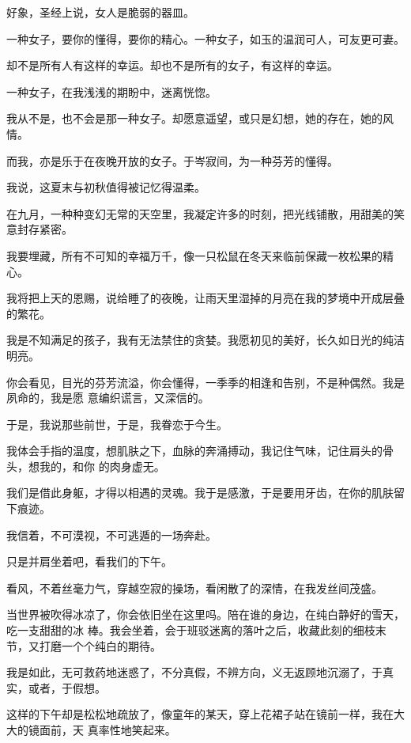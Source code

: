 		好象，圣经上说，女人是脆弱的器皿。

		一种女子，要你的懂得，要你的精心。一种女子，如玉的温润可人，可友更可妻。

		却不是所有人有这样的幸运。却也不是所有的女子，有这样的幸运。

		一种女子，在我浅浅的期盼中，迷离恍惚。

		我从不是，也不会是那一种女子。却愿意遥望，或只是幻想，她的存在，她的风情。

		而我，亦是乐于在夜晚开放的女子。于岑寂间，为一种芬芳的懂得。

	\endwriting



		我说，这夏末与初秋值得被记忆得温柔。


		\vspace{1em}
		在九月，一种种变幻无常的天空里，我凝定许多的时刻，把光线铺散，用甜美的笑意封存紧密。

		我要埋藏，所有不可知的幸福万千，像一只松鼠在冬天来临前保藏一枚松果的精心。

		我将把上天的恩赐，说给睡了的夜晚，让雨天里湿掉的月亮在我的梦境中开成层叠的繁花。

		我是不知满足的孩子，我有无法禁住的贪婪。我愿初见的美好，长久如日光的纯洁明亮。


		你会看见，目光的芬芳流溢，你会懂得，一季季的相逢和告别，不是种偶然。我是夙命的，我是愿
	意编织谎言，又深信的。

		于是，我说那些前世，于是，我眷恋于今生。

		我体会手指的温度，想肌肤之下，血脉的奔涌搏动，我记住气味，记住肩头的骨头，想我的，和你
	的肉身虚无。

		我们是借此身躯，才得以相遇的灵魂。我于是感激，于是要用牙齿，在你的肌肤留下痕迹。

		我信着，不可漠视，不可逃遁的一场奔赴。


		\vspace{1em}
		只是并肩坐着吧，看我们的下午。

		看风，不着丝毫力气，穿越空寂的操场，看闲散了的深情，在我发丝间茂盛。

		当世界被吹得冰凉了，你会依旧坐在这里吗。陪在谁的身边，在纯白静好的雪天，吃一支甜甜的冰
	棒。我会坐着，会于班驳迷离的落叶之后，收藏此刻的细枝末节，又打磨一个个纯白的期待。

		我是如此，无可救药地迷惑了，不分真假，不辨方向，义无返顾地沉溺了，于真实，或者，于假想。

		这样的下午却是松松地疏放了，像童年的某天，穿上花裙子站在镜前一样，我在大大的镜面前，天
	真率性地笑起来。

